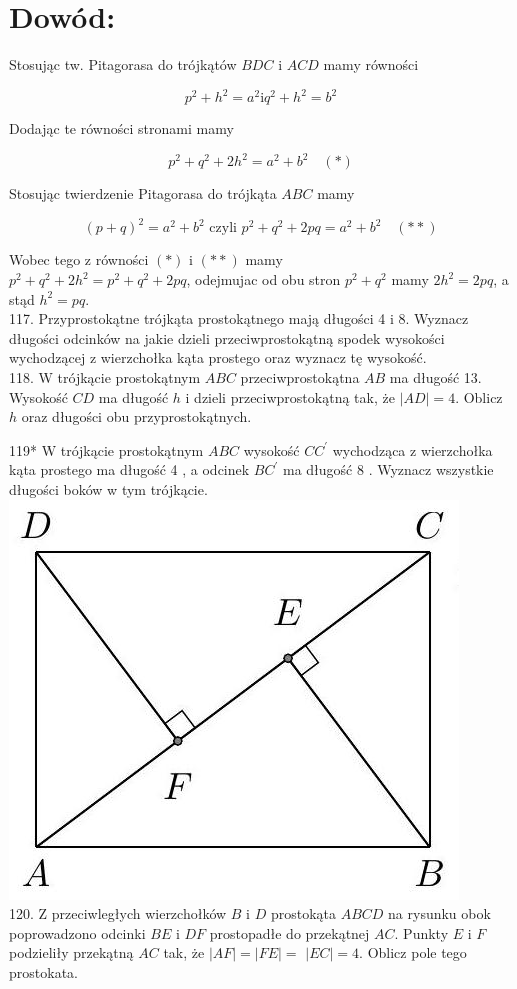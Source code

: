 \documentclass[10pt]{article}
\begin{document}
\section*{Dowód:}
Stosując tw. Pitagorasa do trójkątów \(B D C\) i \(A C D\) mamy równości

\[
p^{2}+h^{2}=a^{2} \mathrm{i} q^{2}+h^{2}=b^{2}
\]

Dodając te równości stronami mamy

\[
p^{2}+q^{2}+2 h^{2}=a^{2}+b^{2} \quad(*)
\]

Stosując twierdzenie Pitagorasa do trójkąta \(A B C\) mamy

\[
(p+q)^{2}=a^{2}+b^{2} \text { czyli } p^{2}+q^{2}+2 p q=a^{2}+b^{2} \quad(* *)
\]

Wobec tego z równości \((*)\) i \((* *)\) mamy\\
\(p^{2}+q^{2}+2 h^{2}=p^{2}+q^{2}+2 p q\), odejmujac od obu stron \(p^{2}+q^{2}\) mamy \(2 h^{2}=2 p q\), a stąd \(h^{2}=p q\).\\
117. Przyprostokątne trójkąta prostokątnego mają długości 4 i 8. Wyznacz długości odcinków na jakie dzieli przeciwprostokątną spodek wysokości wychodzącej z wierzchołka kąta prostego oraz wyznacz tę wysokość.\\
118. W trójkącie prostokątnym \(A B C\) przeciwprostokątna \(A B\) ma długość 13. Wysokość \(C D\) ma długość \(h\) i dzieli przeciwprostokątną tak, że \(|A D|=4\). Oblicz \(h\) oraz długości obu przyprostokątnych.

119* W trójkącie prostokątnym \(A B C\) wysokość \(C C^{\prime}\) wychodząca z wierzchołka kąta prostego ma długość 4 , a odcinek \(B C^{\prime}\) ma długość 8 . Wyznacz wszystkie długości boków w tym trójkącie.\\
\includegraphics[max width=\textwidth, center]{2024_11_21_71f62bd117d375398909g-144(1)}\\
120. Z przeciwległych wierzchołków \(B\) i \(D\) prostokąta \(A B C D\) na rysunku obok poprowadzono odcinki \(B E\) i \(D F\) prostopadłe do przekątnej \(A C\). Punkty \(E\) i \(F\) podzieliły przekątną \(A C\) tak, że \(|A F|=|F E|=\) \(|E C|=4\). Oblicz pole tego prostokata.
\end{document}
